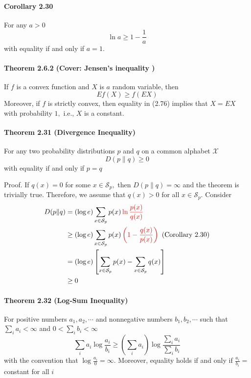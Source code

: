 \documentclass[8pt]{article}
\begin{document}
\begin{tcolorbox}
\paragraph{Corollary 2.30} For any $a>0$
$$
\ln a \geq 1-\frac{1}{a}
$$
with equality if and only if $a=1$.
\end{tcolorbox}

\paragraph{Theorem 2.6.2 (Cover: Jensen's inequality )} If $f$ is a convex function and $X$ is $a$ random variable, then
$$
E f(X) \geq f(E X)
$$
Moreover, if $f$ is strictly convex, then equality in (2.76) implies that $X=E X$ with probability $1,$ i.e., $X$ is a constant.

\begin{tcolorbox}
\paragraph{Theorem 2.31 (Divergence Inequality)} For any two probability distributions $p$ and $q$ on a common alphabet $\mathcal{X}$
$$
D(p \| q) \geq 0
$$
with equality if and only if $p=q$
\end{tcolorbox}
Proof. If $q(x)=0$ for some $x \in \mathcal{S}_{p},$ then $D(p \| q)=\infty$ and the theorem is trivially true. Therefore, we assume that $q(x)>0$ for all $x \in \mathcal{S}_{p}$. Consider
$$
\begin{aligned}
D(p \| q) &=(\log e) \sum_{x \in \mathcal{S}_{p}} p(x) \color{red} \ln \frac{p(x)}{q(x)} \\
& \geq(\log e) \sum_{x \in \mathcal{S}_{p}} p(x) \color{red} \left(1-\frac{q(x)}{p(x)}\right) \color{black} \text{ (Corollary 2.30)} \\
&=(\log e)\left[\sum_{x \in \mathcal{S}_{p}} p(x)-\sum_{x \in \mathcal{S}_{p}} q(x)\right] \\
& \geq 0
\end{aligned}
$$
\begin{tcolorbox}
\paragraph{Theorem 2.32 (Log-Sum Inequality)} For positive numbers $a_{1}, a_{2}, \cdots$ and nonnegative numbers $b_{1}, b_{2}, \cdots$ such that $\sum_{i} a_{i}<\infty$ and $0<\sum_{i} b_{i}<\infty$
$$
\sum_{i} a_{i} \log \frac{a_{i}}{b_{i}} \geq\left(\sum_{i} a_{i}\right) \log \frac{\sum_{i} a_{i}}{\sum_{i} b_{i}}
$$
with the convention that $\log \frac{a_{i}}{0}=\infty$. Moreover, equality holds if and only if $\frac{a_{i}}{b_{i}}=$ constant for all $i$
\end{tcolorbox}
\end{document}
